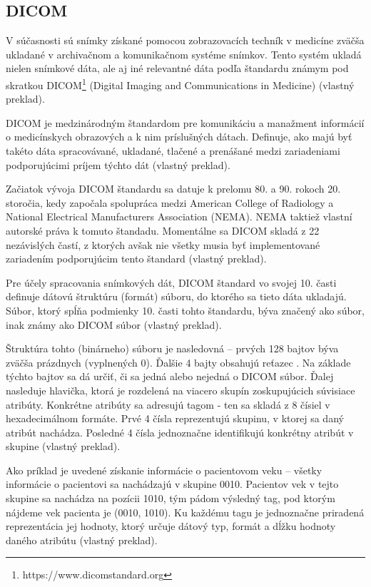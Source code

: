 \subsection {DICOM}\label{dicom}
V súčasnosti sú snímky získané pomocou zobrazovacích techník v medicíne zväčša ukladané v archivačnom a komunikačnom systéme snímkov. Tento systém ukladá nielen snímkové dáta, ale aj iné relevantné dáta podľa štandardu známym pod skratkou DICOM\footnote{https://www.dicomstandard.org} (Digital Imaging and Communications in Medicine) \cite{Varma_2012} (vlastný preklad).

DICOM je medzinárodným štandardom pre komunikáciu a manažment informácií o medicínskych obrazových a k nim príslušných dátach. Definuje, ako majú byť takéto dáta spracovávané, ukladané, tlačené a prenášané medzi zariadeniami podporujúcimi príjem týchto dát \cite{about_dicomlibrary} (vlastný preklad).

Začiatok vývoja DICOM štandardu sa datuje k prelomu 80. a 90. rokoch 20. storočia, kedy započala spolupráca medzi American College of Radiology a National Electrical Manufacturers Association (NEMA). NEMA taktiež vlastní autorské práva k tomuto štandadu. Momentálne sa DICOM skladá z 22 nezávislých častí, z ktorých avšak nie všetky musia byť implementované zariadením podporujúcim tento štandard \cite{dicom_history} (vlastný preklad).

\clearpage

Pre účely spracovania snímkových dát, DICOM štandard vo svojej 10. časti definuje dátovú štruktúru (formát) súboru, do ktorého sa tieto dáta ukladajú. Súbor, ktorý spĺňa podmienky 10. časti tohto štandardu, býva značený ako  súbor, inak známy ako DICOM súbor \cite{Varma_2012} (vlastný preklad).

Štruktúra tohto (binárneho) súboru je nasledovná -- prvých 128 bajtov býva zväčša prázdnych (vyplnených 0). Ďalšie 4 bajty obsahujú reťazec . Na základe týchto bajtov sa dá určiť, či sa jedná alebo nejedná o DICOM súbor. Ďalej nasleduje hlavička, ktorá je rozdelená na viacero skupín zoskupujúcich súvisiace atribúty. Konkrétne atribúty sa adresujú tagom \textendash- ten sa skladá z 8 čísiel v hexadecimálnom formáte. Prvé 4 čísla reprezentujú skupinu, v ktorej sa daný atribút nachádza. Posledné 4 čísla jednoznačne identifikujú konkrétny atribút v skupine \cite{Varma_2012} (vlastný preklad).

Ako príklad je uvedené získanie informácie o pacientovom veku -- všetky informácie o pacientovi sa nachádzajú v skupine 0010. Pacientov vek v tejto skupine sa nachádza na pozícii 1010, tým pádom výsledný tag, pod ktorým nájdeme vek pacienta je (0010, 1010). Ku každému tagu je jednoznačne priradená reprezentácia jej hodnoty, ktorý určuje dátový typ, formát a dĺžku hodnoty daného atribútu  \cite{Varma_2012} (vlastný preklad).

